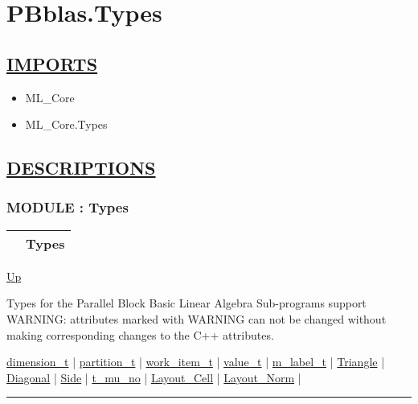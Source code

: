 \chapter*{PBblas.Types}
\hypertarget{ecldoc:toc:PBblas.Types}{}

\section*{\underline{IMPORTS}}
\begin{itemize}
\item ML\_Core
\item ML\_Core.Types
\end{itemize}

\section*{\underline{DESCRIPTIONS}}
\subsection*{MODULE : Types}
\hypertarget{ecldoc:PBblas.Types}{}

{\renewcommand{\arraystretch}{1.5}
\begin{tabularx}{\textwidth}{|>{\raggedright\arraybackslash}l|X|}
\hline
\hspace{0pt} & Types \\
\hline
\end{tabularx}
}

\hyperlink{ecldoc:toc:PBblas}{Up}

\par
Types for the Parallel Block Basic Linear Algebra Sub-programs support WARNING: attributes marked with WARNING can not be changed without making corresponding changes to the C++ attributes.


\hyperlink{ecldoc:pbblas.types.dimension_t}{dimension\_t}  |
\hyperlink{ecldoc:pbblas.types.partition_t}{partition\_t}  |
\hyperlink{ecldoc:pbblas.types.work_item_t}{work\_item\_t}  |
\hyperlink{ecldoc:pbblas.types.value_t}{value\_t}  |
\hyperlink{ecldoc:pbblas.types.m_label_t}{m\_label\_t}  |
\hyperlink{ecldoc:ecldoc-Triangle}{Triangle}  |
\hyperlink{ecldoc:ecldoc-Diagonal}{Diagonal}  |
\hyperlink{ecldoc:ecldoc-Side}{Side}  |
\hyperlink{ecldoc:pbblas.types.t_mu_no}{t\_mu\_no}  |
\hyperlink{ecldoc:pbblas.types.layout_cell}{Layout\_Cell}  |
\hyperlink{ecldoc:pbblas.types.layout_norm}{Layout\_Norm}  |

\rule{\textwidth}{0.4pt}

